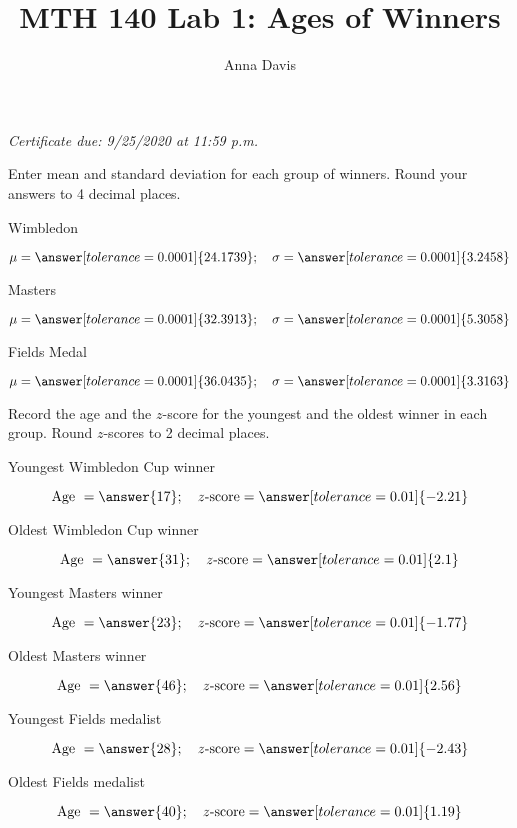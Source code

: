 \documentclass{ximera}
\author{Anna Davis} \title{MTH 140 Lab 1: Ages of Winners}
\begin{document}
\begin{abstract}

\end{abstract}
\maketitle
 \textit{Certificate due: 9/25/2020 at 11:59 p.m.}
\begin{problem}\label{prob:140lab1prob1}
Enter mean and standard deviation for each group of winners.  Round your answers to 4 decimal places.
\begin{center}
Wimbledon
\end{center}
$$\mu=\answer[tolerance=0.0001]{24.1739};\quad\sigma=\answer[tolerance=0.0001]{3.2458}$$
\begin{center}
Masters
\end{center}
$$\mu=\answer[tolerance=0.0001]{32.3913};\quad\sigma=\answer[tolerance=0.0001]{5.3058}$$
\begin{center}
Fields Medal
\end{center}
$$\mu=\answer[tolerance=0.0001]{36.0435};\quad\sigma=\answer[tolerance=0.0001]{3.3163}$$
\end{problem}

\begin{problem}\label{prob:140lab1prob2}
Record the age and the $z$-score for the youngest and the oldest winner in each group.  Round $z$-scores to 2 decimal places.

\begin{center}
Youngest Wimbledon Cup winner
\end{center}
$$\mbox{Age }=\answer{17};\quad z\mbox{-score}=\answer[tolerance=0.01]{-2.21}$$

\begin{center}
Oldest Wimbledon Cup winner
\end{center}
$$\mbox{Age }=\answer{31};\quad z\mbox{-score}=\answer[tolerance=0.01]{2.1}$$

\begin{center}
Youngest Masters winner
\end{center}
$$\mbox{Age }=\answer{23};\quad z\mbox{-score}=\answer[tolerance=0.01]{-1.77}$$

\begin{center}
Oldest Masters winner
\end{center}
$$\mbox{Age }=\answer{46};\quad z\mbox{-score}=\answer[tolerance=0.01]{2.56}$$

\begin{center}
Youngest Fields medalist
\end{center}
$$\mbox{Age }=\answer{28};\quad z\mbox{-score}=\answer[tolerance=0.01]{-2.43}$$

\begin{center}
Oldest Fields medalist
\end{center}
$$\mbox{Age }=\answer{40};\quad z\mbox{-score}=\answer[tolerance=0.01]{1.19}$$

\end{problem}
\end{document}
